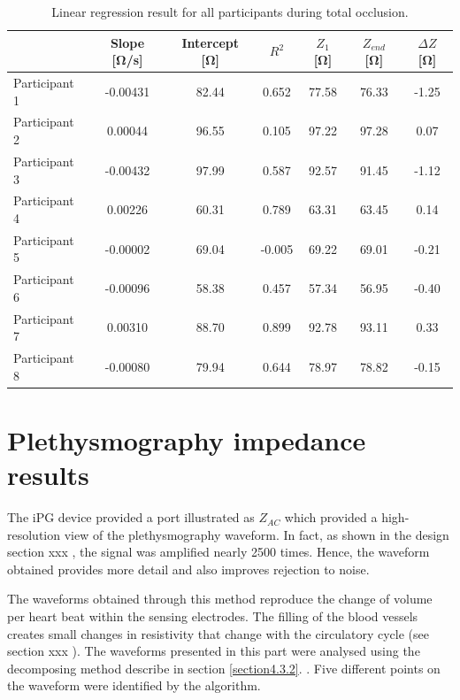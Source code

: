 \begin{table}[h]
	\caption{Linear regression result for all participants during total occlusion.}
	\label{tbl:total_occlusion:region6}
	\centering
	\begin{tabu}{lcccccc}
		\toprule
		& \textbf{Slope [\si{\ohm/\second}]} & \textbf{Intercept [\si{\ohm}]} & \textbf{$R^2$} & \textbf{$Z_1$ [\si{\ohm}]} & \textbf{$Z_{end}$ [\si{\ohm}]} & \textbf{ $\Delta Z$ [\si{\ohm}]} \\ \midrule
	   	Participant 1  &  -0.00431  &  82.44   &      0.652 &   77.58 &  76.33  &   -1.25\\ 
		Participant 2  &   0.00044  &  96.55   &      0.105 &   97.22 &   97.28 &    0.07\\
		Participant 3  &  -0.00432  &  97.99   &      0.587 &   92.57 &   91.45 &   -1.12\\
		Participant 4  &   0.00226  &  60.31   &      0.789 &   63.31 &   63.45 &    0.14\\
		Participant 5  &  -0.00002  &  69.04   &     -0.005 &   69.22 &   69.01 &   -0.21\\
		Participant 6  &  -0.00096  &  58.38   &      0.457 &   57.34 &   56.95 &   -0.40\\
		Participant 7  &   0.00310  &  88.70   &      0.899 &   92.78 &   93.11 &    0.33\\
		Participant 8  &  -0.00080  &  79.94   &      0.644 &   78.97 &   78.82 &   -0.15\\ \bottomrule
	\end{tabu} 
\end{table}



\pagebreak
\section{Plethysmography impedance results}
\label{section5.3}
The iPG device provided a port illustrated as $Z_{AC}$  which provided a high-resolution view of the plethysmography waveform.  In fact, as shown in the design section xxx , the signal was amplified nearly 2500 times. Hence, the waveform obtained provides more detail and also improves rejection to noise.

The waveforms obtained through this method reproduce the change of volume per heart beat within the sensing electrodes. The filling of the blood vessels creates small changes in resistivity that change with the circulatory cycle (see section xxx ). The waveforms presented in this part were analysed using the decomposing method describe in section \ref{section4.3.2}. . Five different points on the waveform were identified by the algorithm.

